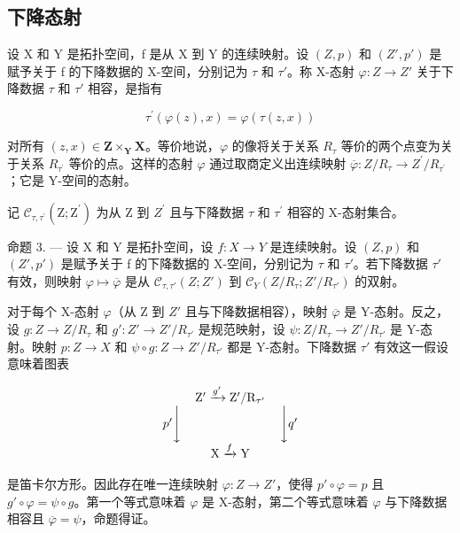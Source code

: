 \subsection{下降态射}

设 X 和 Y 是拓扑空间，f 是从 X 到 Y 的连续映射。设 \((Z,p)\) 和 \((Z',p')\) 是赋予关于 f 的下降数据的 X-空间，分别记为 \(\tau\) 和 \(\tau'\)。称 X-态射 \(\varphi\colon Z\to Z'\) 关于下降数据 \(\tau\) 和 \(\tau'\) 相容，是指有

\[
\tau^ {\prime} (\varphi (z), x) = \varphi (\tau (z, x))
\]

对所有 \((z,x)\in\mathbf{Z}\times_{\mathbf{Y}}\mathbf{X}\)。等价地说，\(\varphi\) 的像将关于关系 \(R_{\tau}\) 等价的两个点变为关于关系 \(R_{\tau^{\prime}}\) 等价的点。这样的态射 \(\varphi\) 通过取商定义出连续映射 \(\overline{\varphi}:Z/R_{\tau}\to Z^{\prime}/R_{\tau^{\prime}}\)；它是 Y-空间的态射。

记 \(\mathcal{C}_{\tau,\tau^{\prime}}(\mathrm{Z};\mathrm{Z}^{\prime})\) 为从 Z 到 \(Z^{\prime}\) 且与下降数据 \(\tau\) 和 \(\tau^{\prime}\) 相容的 X-态射集合。

命题 3. --- 设 X 和 Y 是拓扑空间，设 \(f\colon X \to Y\) 是连续映射。设 \((Z,p)\) 和 \((Z',p')\) 是赋予关于 f 的下降数据的 X-空间，分别记为 \(\tau\) 和 \(\tau'\)。若下降数据 \(\tau'\) 有效，则映射 \(\varphi \mapsto \overline{\varphi}\) 是从 \(\mathcal{C}_{\tau,\tau'}(Z;Z')\) 到 \(\mathcal{C}_Y(Z/R_\tau;Z'/R_{\tau'})\) 的双射。

对于每个 X-态射 \(\varphi\)（从 Z 到 \(Z'\) 且与下降数据相容），映射 \(\overline{\varphi}\) 是 Y-态射。反之，设 \(g\colon Z\to Z/R_{\tau}\) 和 \(g'\colon Z'\to Z'/R_{\tau'}\) 是规范映射，设 \(\psi\colon Z/R_{\tau}\to Z'/R_{\tau'}\) 是 Y-态射。映射 \(p\colon Z\to X\) 和 \(\psi\circ g\colon Z\to Z'/R_{\tau'}\) 都是 Y-态射。下降数据 \(\tau'\) 有效这一假设意味着图表

\[
\begin{array}{c} \mathrm {Z^ {\prime}} \xrightarrow {g ^ {\prime}} \mathrm {Z}^ {\prime} / \mathrm {R}_ {\tau^ {\prime}} \\ p ^ {\prime} \Biggl \downarrow \qquad \qquad \qquad \qquad \Biggl \downarrow q ^ {\prime} \\ \mathrm{X} \xrightarrow {f} \mathrm{Y} \end{array}
\]

是笛卡尔方形。因此存在唯一连续映射 \(\varphi\colon Z\to Z'\)，使得 \(p'\circ\varphi=p\) 且 \(g'\circ\varphi=\psi\circ g\)。第一个等式意味着 \(\varphi\) 是 X-态射，第二个等式意味着 \(\varphi\) 与下降数据相容且 \(\overline{\varphi}=\psi\)，命题得证。

